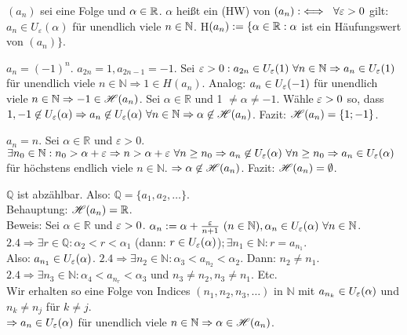 \documentclass[a4paper,oneside,DIV15,BCOR12mm]{scrbook}
\begin{document}
\begin{definition}[Häufungwerte]
$(a_n)$ sei eine Folge und $\alpha \in\mathbb{R}$. $\alpha$ heißt ein  (HW) von $(a_n) :\iff\ \forall \varepsilon > 0$ gilt: $a_n \in  U_\varepsilon(\alpha)$ für unendlich viele $n\in\mathbb{N}$. H$(a_n) := \{\alpha\in\mathbb{R}: \alpha$ ist ein Häufungswert von $(a_n) \}$.
\end{definition}

\begin{beispiele}
\item $a_n = (-1)^n$. $a_{2n} = 1, a_{2n-1} = -1.$ 
Sei $\ep > 0: a_{2n} \in U_{\ep}(1)\ \forall n \in \mathbb{N} \Rightarrow a_n \in U_{\ep}(1)$ 
für unendlich viele $n \in \mathbb{N} \Rightarrow 1 \in H (a_n)$. 
Analog: $a_n \in U_{\varepsilon}(-1)$ für unendlich viele $n \in \mathbb{N} \Rightarrow -1 \in \mathscr{H}(a_n)$. 
Sei $\alpha \in \mathbb{R}$ und 1 $\neq \alpha \neq -1$. 
W\"{a}hle $\varepsilon > 0$ so, dass $1, -1 \not\in U_{\varepsilon}(\alpha) \Rightarrow a_n \not\in U_{\varepsilon}(\alpha)\ \forall n \in \mathbb{N} \Rightarrow \alpha \not\in \mathscr{H}(a_{n})$. 
Fazit: $\mathscr{H}(a_n) = \{1; -1\}$.
\item $a_n = n$. Sei $\alpha \in \mathbb{R}$ und $\varepsilon > 0$. $\exists n_0 \in \mathbb{N}: n_0 > \alpha + \varepsilon \Rightarrow n > \alpha + \varepsilon\ \forall n \geq n_0 \Rightarrow a_n \not\in U_{\varepsilon}(\alpha)\ \forall n \geq n_0 \Rightarrow a_n \in U_{\varepsilon}(\alpha)$ für h\"{o}chstens endlich viele $n \in \mathbb{N}$. $\Rightarrow \alpha \not\in \mathscr{H}(a_n)$. Fazit: $\mathscr{H}(a_n) = \emptyset$.
\item $\mathbb{Q}$ ist abz\"{a}hlbar. Also: $\mathbb{Q} = \{a_1, a_2, \ldots\}$.\\
Behauptung: $\mathscr{H}(a_n) = \mathbb{R}$. \\
Beweis: Sei $\alpha \in \mathbb{R}$ und $\varepsilon > 0$. $\alpha_n := \alpha + \frac{\varepsilon}{n + 1}\  (n \in \mathbb{N}), \alpha_n \in U_{\varepsilon}(\alpha)\ \forall n\in\mathbb{N}$. \\
$2.4 \Rightarrow \exists r \in \mathbb{Q}: \alpha_2 < r < \alpha_1 $ (dann: $r \in U_{\varepsilon}(\alpha)$)$; \exists n_1 \in \mathbb{N}: r = a_{n_1}$. \\
Also: $a_{n_1} \in U_{\varepsilon}(\alpha)$. $2.4 \Rightarrow \exists n_2 \in \mathbb{N}: \alpha_3 < a_{n_2} < \alpha_2$. Dann: $n_2 \neq n_1$. $2.4 \Rightarrow \exists n_3 \in \mathbb{N}: \alpha_4 < a_{n_r} < \alpha_3$ und $n_3 \neq n_2, n_3 \neq n_1$. Etc. \\
Wir erhalten so eine Folge von Indices $(n_1, n_2, n_3, \ldots)$ in $\mathbb{N}$ mit $a_{n_k} \in U_{\varepsilon}(\alpha)$ und $n_k \neq n_j$ f\"{u}r $k \neq j$.\\
$\Rightarrow a_n \in U_{\varepsilon}(\alpha)$ f\"{u}r unendlich viele $n \in \mathbb{N} \Rightarrow \alpha \in \mathscr{H}(a_n)$.
\end{beispiele}
\end{document}
